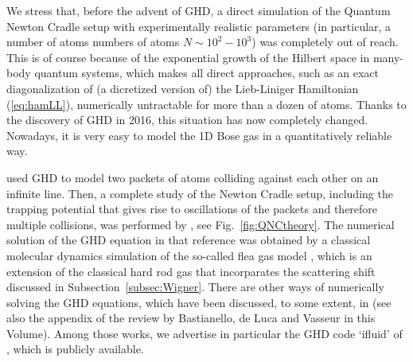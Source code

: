 \documentclass[onecolumn,amsfonts,showpacs,superscriptaddress]{revtex4-1}
\begin{document}
We stress that, before the advent of GHD, a direct simulation of the Quantum Newton Cradle setup with experimentally realistic parameters (in particular, a number of atoms numbers of atoms $N \sim 10^2-10^3$) was completely out of reach. This is of course because of the exponential growth of the Hilbert space in  many-body quantum systems, which makes all direct approaches, such as an exact diagonalization of (a dicretized version of) the Lieb-Liniger Hamiltonian (\ref{eq:hamLL}), numerically untractable for more than a  dozen of atoms. Thanks to the discovery of GHD in 2016, this situation has now completely changed. Nowadays, it is very easy to model the 1D Bose gas in a quantitatively reliable way.



 \cite{bulchandani2017solvable} used GHD to model two packets of atoms colliding against each other on an infinite line. Then, a complete study of the Newton Cradle setup, including the trapping potential that gives rise to oscillations of the packets and therefore multiple collisions, was performed by \cite{caux2019hydrodynamics}, see Fig.~\ref{fig:QNCtheory}. The numerical solution of the GHD equation in that reference was obtained by a classical molecular dynamics simulation of the so-called flea gas model \citep{doyon2018soliton}, which is an extension of the classical hard rod gas that incorparates the scattering shift discussed in Subsection~\ref{subsec:Wigner}. There are other ways of numerically solving the GHD equations, which have been discussed, to some extent, in \citep{bulchandani2017solvable,bulchandani2018bethe,doyon2017large,bastianello2019generalized,moller2020introducing,bastianello_thermalization_2020,moller_extension_2021} (see also the appendix of the review by Bastianello, de Luca and Vasseur in this Volume). Among those works, we advertise in particular the GHD code `ifluid' of \cite{moller2020introducing}, which is publicly available.
\end{document}
